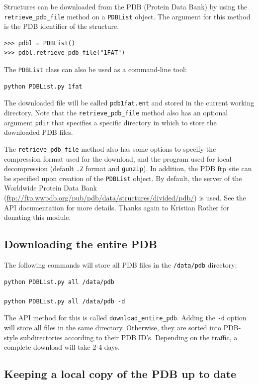 Structures can be downloaded from the PDB (Protein Data Bank)
by using the \texttt{retrieve\_pdb\_file} method on a \texttt{PDBList} object.
The argument for this method is the PDB identifier of the structure.

\begin{verbatim}
>>> pdbl = PDBList()
>>> pdbl.retrieve_pdb_file("1FAT")
\end{verbatim}

The \texttt{PDBList} class can also be used as a command-line tool:
\begin{verbatim}
python PDBList.py 1fat
\end{verbatim}
The downloaded file will be called \texttt{pdb1fat.ent} and stored
in the current working directory. Note that the \texttt{retrieve\_pdb\_file}
method also has an optional argument \texttt{pdir} that specifies
a specific directory in which to store the downloaded PDB files.

The \texttt{retrieve\_pdb\_file} method also has some options to specify
the compression format used for the download, and the program used
for local decompression (default \texttt{.Z} format and \texttt{gunzip}).
In addition, the PDB ftp site can be specified upon creation of the
\texttt{PDBList} object. By default, the server of the Worldwide Protein Data Bank (\url{ftp://ftp.wwpdb.org/pub/pdb/data/structures/divided/pdb/})
is used. See the API documentation for more details. Thanks again
to Kristian Rother for donating this module.

\subsection{Downloading the entire PDB}

The following commands will store all PDB files in the \texttt{/data/pdb}
directory:

\begin{verbatim}
python PDBList.py all /data/pdb

python PDBList.py all /data/pdb -d
\end{verbatim}
\noindent The API method for this is called \texttt{download\_entire\_pdb}.
Adding the \texttt{-d} option will store all files in the same directory.
Otherwise, they are sorted into PDB-style subdirectories according
to their PDB ID's. Depending on the traffic, a complete download will
take 2-4 days.

\subsection{Keeping a local copy of the PDB up to date}

